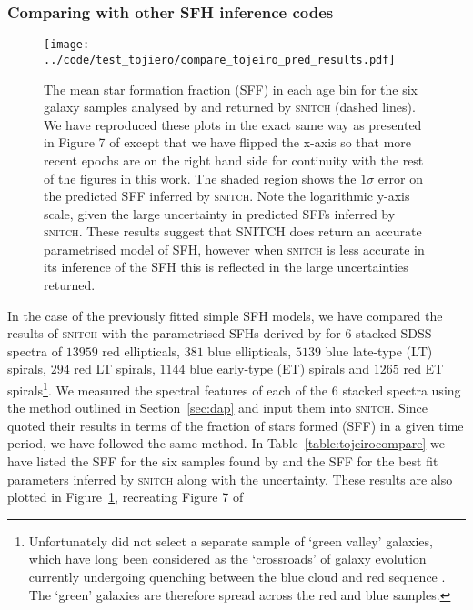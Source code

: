 \documentclass[useAMS,usenatbib]{mn2e}
\begin{document}
\subsubsection{Comparing with other SFH inference codes}\label{secsec:compare}

\begin{figure}
\centering
\texttt{[image: ../code/test\_tojiero/compare\_tojeiro\_pred\_results.pdf]}
\caption{The mean star formation fraction (SFF) in each age bin for the six galaxy samples analysed by \protect\cite[][solid lines]{tojeiro13} and returned by \textsc{snitch} (dashed lines). We have reproduced these plots in the exact same way as presented in Figure 7 of \citeauthor{tojeiro13} except that we have flipped the x-axis so that more recent epochs are on the right hand side for continuity with the rest of the figures in this work. The shaded region shows the $1\sigma$ error on the predicted SFF inferred by \textsc{snitch}. Note the logarithmic y-axis scale, given the large uncertainty in predicted SFFs inferred by \textsc{snitch}. These results suggest that \textsc{SNITCH} does return an accurate parametrised model of SFH, however when \textsc{snitch} is less accurate in its inference of the SFH this is reflected in the large uncertainties returned. }
\label{fig:tojeirocompare}
\end{figure}

In the case of the previously fitted simple SFH models, we have compared the results of \textsc{snitch} with the parametrised SFHs derived by \cite{tojeiro13} for $6$ stacked SDSS spectra of $13959$ red ellipticals, $381$ blue ellipticals, $5139$ blue late-type (LT) spirals, $294$ red LT spirals, $1144$ blue early-type (ET) spirals and $1265$ red ET spirals\footnote{Unfortunately \citeauthor{tojeiro13} did not select a separate sample of `green valley' galaxies, which have long been considered as the `crossroads' of galaxy evolution currently undergoing quenching between the blue cloud and red sequence \citep{smethurst15}. The `green' galaxies are therefore spread across the \protect\citeauthor{tojeiro13} red and blue samples. }. We measured the spectral features of each of the $6$ stacked spectra using the method outlined in Section~\ref{sec:dap} and input them into \textsc{snitch}. Since \citeauthor{tojeiro13} quoted their results in terms of the fraction of stars formed (SFF) in a given time period, we have followed the same method. In Table~\ref{table:tojeirocompare} we have listed the SFF for the six samples found by \citeauthor{tojeiro13} and the SFF for the best fit parameters inferred by \textsc{snitch} along with the uncertainty. These results are also plotted in Figure~\ref{fig:tojeirocompare}, recreating Figure 7 of \citeauthor{tojeiro13}
\end{document}
